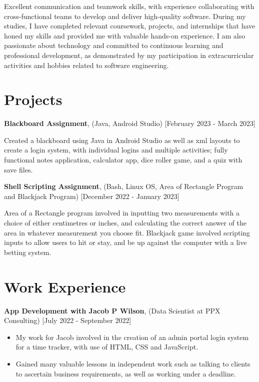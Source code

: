 \documentclass[10pt]{article}
\begin{document}
{Excellent communication and teamwork skills, with experience collaborating with cross-functional teams to develop and deliver high-quality software.
During my studies, I have completed relevant coursework, projects, and internships that have honed my skills and provided me with valuable hands-on experience. I am also passionate about technology and committed to continuous learning and professional development, as demonstrated by my participation in extracurricular activities and hobbies related to software engineering.

\section*{\bf Projects}
{\bf Blackboard Assignment}, (Java, Android Studio) [February 2023 - March 2023]
\setlength{\itemsep}{0.10ex}
\item Created a blackboard using Java in Android Studio as well as xml layouts to create a login system, with individual logins and multiple activities; fully functional notes application, calculator app, dice roller game, and a quiz with save files.

\item {\bf Shell Scripting Assignment}, (Bash, Linux OS, Area of Rectangle Program and Blackjack Program) [December 2022 - January 2023]
\setlength{\itemsep}{0.10ex}
\item Area of a Rectangle program involved in inputting two measurements with a choice of either centimetres or inches, and calculating the correct answer of the area in whatever measurement you choose fit. Blackjack game involved scripting inputs to allow users to hit or stay, and be up against the computer with a live betting system.



\section*{\bf Work Experience}


{\bf App Development with Jacob P Wilson}, (Data Scientist at PPX Consulting) [July 2022 - September 2022]
\begin{itemize}
\setlength{\itemsep}{0.10ex}
\item My work for Jacob involved in the creation of an admin portal login system for a time tracker, with use of HTML, CSS and JavaScript. 
\item Gained many valuable lessons in independent work such as talking to clients to ascertain
business requirements, as well as working under a deadline.



\end{itemize}}
\end{document}
